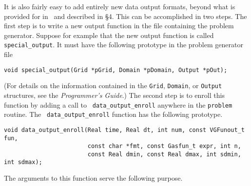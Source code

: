 It is also fairly easy to add entirely new data output formats, beyond what
is provided for in \ath\ and described in \S4.
This can be accomplished in two steps.
The first step is to write a new output function in the file
containing the problem generator.  Suppose for example that the new
output function is called {\tt special\_output}.  It must have the
following prototype in the problem generator file
\begin{verbatim}
void special_output(Grid *pGrid, Domain *pDomain, Output *pOut);
\end{verbatim}
(For details on the information contained in the {\tt Grid}, {\tt Domain},
or {\tt Output} structures, see the {\it Programmer's Guide}.)  The second step
is to enroll this function by adding a call to {\tt
data\_output\_enroll} anywhere in the {\tt problem} routine.  The {\tt
data\_output\_enroll} function has the following prototype.
\begin{verbatim}
void data_output_enroll(Real time, Real dt, int num, const VGFunout_t fun,
                        const char *fmt, const Gasfun_t expr, int n,
                        const Real dmin, const Real dmax, int sdmin, int sdmax);
\end{verbatim}
The arguments to this function serve the following purpose.
